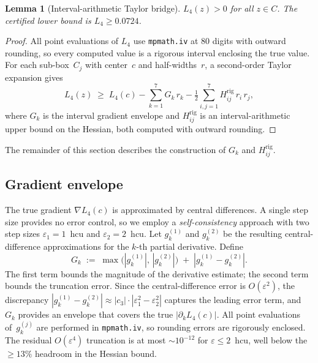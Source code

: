 \documentclass[11pt,a4paper]{amsart}
\newtheorem{lemma}[theorem]{Lemma}
\theoremstyle{definition}
\theoremstyle{remark}
\begin{document}
\begin{lemma}[Interval-arithmetic Taylor bridge]\label{lem:bridge}
$L_4(z) > 0$ for all $z \in C$.
The certified lower bound is $L_4 \ge 0.0724$.
\end{lemma}
\begin{proof}
All point evaluations of $L_4$ use \texttt{mpmath.iv} at $80$
digits with outward rounding, so every computed value is a
rigorous interval enclosing the true value.
For each sub-box~$C_j$ with center~$c$ and half-widths~$r$,
a second-order Taylor expansion gives
\begin{equation}\label{eq:taylor-bound}
  L_4(z) \;\ge\; L_4(c)
    - \sum_{k=1}^{7} G_k\, r_k
    - \tfrac{1}{2}\sum_{i,j=1}^{7} H_{ij}^{\mathrm{rig}}\, r_i\, r_j,
\end{equation}
where $G_k$ is the interval gradient envelope and
$H_{ij}^{\mathrm{rig}}$ is an interval-arithmetic upper bound
on the Hessian, both computed with outward rounding.
\end{proof}

The remainder of this section describes the construction of
$G_k$ and $H_{ij}^{\mathrm{rig}}$.

\subsection{Gradient envelope}

The true gradient $\nabla L_4(c)$ is approximated by central
differences.
A single step size provides no error control, so we employ
a \emph{self-consistency} approach with two step sizes
$\varepsilon_1 = 1$~hcu and $\varepsilon_2 = 2$~hcu.
Let $g_k^{(1)}$ and $g_k^{(2)}$ be the resulting central-difference
approximations for the $k$-th partial derivative.
Define
\begin{equation}\label{eq:grad-env}
  G_k \;:=\; \max\bigl(|g_k^{(1)}|,\,|g_k^{(2)}|\bigr)
          \;+\; |g_k^{(1)} - g_k^{(2)}|.
\end{equation}
The first term bounds the magnitude of the derivative estimate;
the second term bounds the truncation error.
Since the central-difference error is $O(\varepsilon^2)$,
the discrepancy
$|g_k^{(1)} - g_k^{(2)}| \approx |c_3|\cdot|\varepsilon_1^2 - \varepsilon_2^2|$
captures the leading error term, and $G_k$ provides an envelope
that covers the true $|\partial_k L_4(c)|$.
All point evaluations of~$g_k^{(j)}$ are performed in
\texttt{mpmath.iv}, so rounding errors are rigorously enclosed.
The residual $O(\varepsilon^4)$ truncation is at most
$\sim 10^{-12}$ for $\varepsilon \le 2$~hcu,
well below the $\ge 13\%$ headroom in the Hessian bound.
\end{document}
